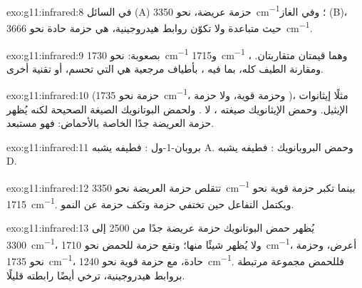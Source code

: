 \begin{solution}{exo:g11:infrared:8}
في السائل (A) حزمة  عريضة، نحو
\qty{3350}{cm^{-1}}؛ وفي الغاز (B)، حيث  متباعدة
ولا تكوّن روابط هيدروجينية، هي حزمة حادة نحو
\qty{3666}{cm^{-1}}.
\end{solution}

\begin{solution}{exo:g11:infrared:9}
بصعوبة: نحو \qty{1730}{cm^{-1}} 
و\qty{1715}{cm^{-1}} ، وهما قيمتان متقاربتان. ومقارنة
الطيف كله، بما فيه ، بأطياف مرجعية
هي التي تحسم، أو تقنية أخرى.
\end{solution}

\begin{solution}{exo:g11:infrared:10}
 (حزمة  نحو \qty{1735}{cm^{-1}}، وحزمة  قوية، ولا
حزمة )، مثلًا إيثانوات الإيثيل. وحمض الإيثانويك صيغته ، لا
. ولحمض البوتانويك الصيغة الصحيحة لكنه يُظهر حزمة 
العريضة جدًا الخاصة بالأحماض: فهو مستبعد.
\end{solution}

\begin{solution}{exo:g11:infrared:11}
بروبان-1-ول : فطيفه يشبه A. وحمض البروبانويك :
فطيفه يشبه D.
\end{solution}

\begin{solution}{exo:g11:infrared:12}
تتقلص حزمة  العريضة نحو \qty{3350}{cm^{-1}} بينما تكبر حزمة
 قوية نحو \qty{1715}{cm^{-1}}. ويكتمل التفاعل
حين تختفي حزمة  وتكف حزمة  عن
النمو.
\end{solution}

\begin{solution}{exo:g11:infrared:13}
يُظهر حمض البوتانويك حزمة  عريضة جدًا من 2500 إلى
\qty{3300}{cm^{-1}}، ولا يُظهر  شيئًا منها؛ وتقع حزمة  للحمض
نحو \qty{1710}{cm^{-1}}، أعرض، وحزمة  نحو \qty{1735}{cm^{-1}}،
حادة، مع حزمة  قوية نحو \qty{1240}{cm^{-1}}. فللحمض
مجموعة  مرتبطة بروابط هيدروجينية، ترخي أيضًا رابطته
 قليلًا.
\end{solution}

